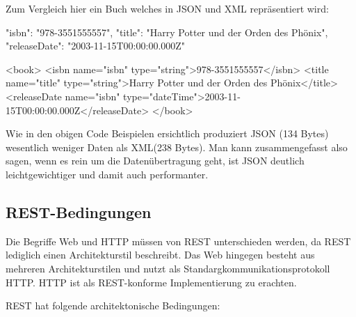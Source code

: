 Zum Vergleich hier ein Buch welches in JSON und XML repräsentiert wird:
\begin{JsCode}
{
    "isbn": "978-3551555557",
    "title": "Harry Potter und der Orden des Phönix",
    "releaseDate": "2003-11-15T00:00:00.000Z"
}
\end{JsCode}

\begin{XmlCode}
<book>
    <isbn name="isbn" type="string">978-3551555557</isbn>
    <title name="title" type="string">Harry Potter und der Orden des Phönix</title>
    <releaseDate name="isbn" type="dateTime">2003-11-15T00:00:00.000Z</releaseDate>
</book>
\end{XmlCode}

Wie in den obigen Code Beispielen ersichtlich produziert JSON (134 Bytes) wesentlich weniger Daten als XML(238 Bytes).
Man kann zusammengefasst also sagen, wenn es rein um die Datenübertragung geht, ist JSON deutlich leichtgewichtiger und damit auch performanter.

\subsection{REST-Bedingungen}
Die Begriffe Web und HTTP müssen von REST unterschieden werden, da REST lediglich einen Architekturstil beschreibt. Das Web hingegen besteht aus mehreren Architekturstilen und nutzt als Standargkommunikationsprotokoll HTTP. HTTP ist als
REST-konforme Implementierung zu erachten.
\newline


REST hat folgende architektonische Bedingungen:

